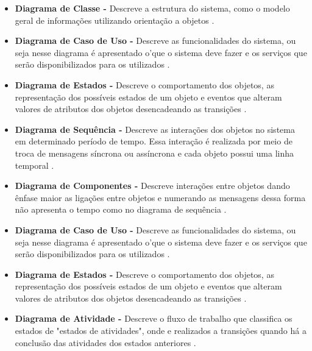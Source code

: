    \begin{itemize}
       \item \textbf{Diagrama de Classe -}
       Descreve a estrutura do sistema, como o modelo geral de informações utilizando orientação a objetos \cite{nunesfundamental}.
        
        \item \textbf{Diagrama de Caso de Uso -}
        Descreve as funcionalidades do sistema, ou seja nesse diagrama é apresentado o'que o sistema deve fazer e os serviços que serão disponibilizados para os utilizados \cite{nunesfundamental}.
        
        \item \textbf{Diagrama de Estados -}
        Descreve o comportamento dos objetos, as representação dos possíveis estados de um objeto e eventos que alteram valores de atributos dos objetos desencadeando as transições \cite{uml}.
        
        \item \textbf{Diagrama de Sequência -}
        Descreve as interações dos objetos no sistema em determinado período de tempo. Essa interação é realizada por meio de troca de mensagens síncrona ou assíncrona e cada objeto possui uma linha temporal \cite{uml}.
        
        \item \textbf{Diagrama de Componentes -}
        Descreve interações entre objetos dando ênfase maior as ligações entre objetos e numerando as mensagens dessa forma não apresenta o tempo como no diagrama de sequência \cite{uml}.
        
        \item \textbf{Diagrama de Caso de Uso -}
        Descreve as funcionalidades do sistema, ou seja nesse diagrama é apresentado o'que o sistema deve fazer e os serviços que serão disponibilizados para os utilizados \cite{nunesfundamental}.
        
        \item \textbf{Diagrama de Estados -}
        Descreve o comportamento dos objetos, as representação dos possíveis estados de um objeto e eventos que alteram valores de atributos dos objetos desencadeando as transições \cite{uml}.
        
        \item \textbf{Diagrama de Atividade -}
        Descreve o fluxo de trabalho que classifica os estados de "estados de atividades", onde e realizados a transições quando há a conclusão das atividades dos estados anteriores \cite{uml}.
        

\end{itemize}
